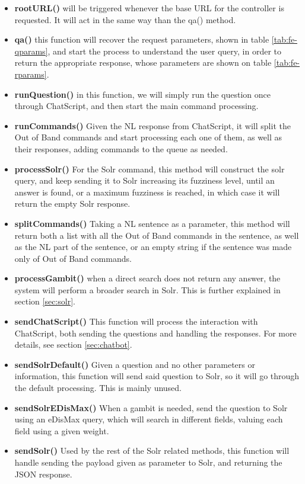 \begin{itemize}
  \item \textbf{rootURL()} will be triggered whenever the base URL for the controller is requested. It will act in the same way than the qa() method.
  \item \textbf{qa()} this function will recover the request parameters, shown in table \ref{tab:fe-qparams}, and start the process to understand the user query, in order to return the appropriate response, whose parameters are shown on table \ref{tab:fe-rparams}.
  \item \textbf{runQuestion()} in this function, we will simply run the question once through ChatScript, and then start the main command processing.
  \item \textbf{runCommands()} Given the \ac{NL} response from ChatScript, it will split the Out of Band commands and start processing each one of them, as well as their responses, adding commands to the queue as needed.
  \item \textbf{processSolr()} For the Solr command, this method will construct the solr query, and keep sending it to Solr increasing its fuzziness level, until an answer is found, or a maximum fuzziness is reached, in which case it will return the empty Solr response.
  \item \textbf{splitCommands()} Taking a \ac{NL} sentence as a parameter, this method will return both a list with all the Out of Band commands in the sentence, as well as the \ac{NL} part of the sentence, or an empty string if the sentence was made only of Out of Band commands. 
  \item \textbf{processGambit()} when a direct search does not return any answer, the system will perform a broader search in Solr. This is further explained in section \ref{sec:solr}.
  \item \textbf{sendChatScript()} This function will process the interaction with ChatScript, both sending the questions and handling the responses. For more details, see section \ref{sec:chatbot}.
  \item \textbf{sendSolrDefault()} Given a question and no other parameters or information, this function will send said question to Solr, so it will go through the default processing. This is mainly unused.
  \item \textbf{sendSolrEDisMax()} When a gambit is needed, send the question to Solr using an \ac{eDisMax} query, which will search in different fields, valuing each field using a given weight. 
  \item \textbf{sendSolr()} Used by the rest of the Solr related methods, this function will handle sending the payload given as parameter to Solr, and returning the JSON response.
\end{itemize}

